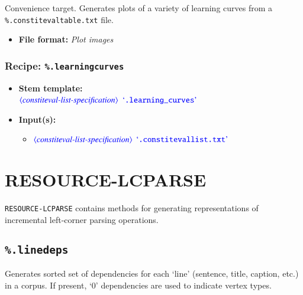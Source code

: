 \documentclass[12pt]{report}
\def\blue{\color{blue}}
\begin{document}
Convenience target. Generates plots of a variety of learning curves from a {\blue\tt \%.constitevaltable.txt} file.

\begin{itemize}
      \item \textbf{File format:} \textit{Plot images}
\end{itemize}

\subsection{Recipe: {\blue\tt \%.learning\textunderscore curves}}

\begin{itemize}
      \item \textbf{Stem template:}\\
      $\dtype{constiteval-list-specification}$ $\dcode{.learning\textunderscore curves}$
      \item \textbf{Input(s):}
      \begin{itemize}
            \item $\dtype{constiteval-list-specification}$ $\dcode{.constitevallist.txt}$
      \end{itemize}
\end{itemize}






\chapter{RESOURCE-LCPARSE}

{\tt RESOURCE-LCPARSE} contains methods for generating representations of incremental left-corner parsing operations.

\section{{\blue\tt \%.linedeps}}
Generates sorted set of dependencies for each `line' (sentence, title, caption, etc.) in a corpus. If present, `0' dependencies are used to indicate vertex types.
\end{document}
